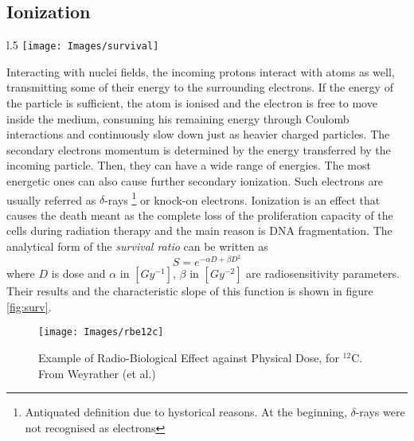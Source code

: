 \documentclass[12pt, a4paper, twoside]{book}
\begin{document}
\subsection{Ionization}
\begin{wrapfigure}{l}{.5\textwidth}
\vspace{-6mm}
\centering
{\texttt{[image: Images/survival]}}
\caption{CHO cells Survival ratio realted with dose, for $X$-rays and $^{12}$C ions. From Weyrather (et al.) \cite{weyr:rbe}}
\label{fig:surv}
\end{wrapfigure}
Interacting with nuclei fields, the incoming protons interact with atoms as well, transmitting some of their energy to the surrounding electrons.
If the energy of the particle is sufficient, the atom is ionised and the electron is free to move inside the medium, consuming his remaining energy through Coulomb interactions and continuously slow down just as heavier charged particles. The secondary electrons momentum is determined by the energy transferred by the incoming particle. Then, they can have a wide range of energies. The most energetic ones can also cause further secondary ionization. 
Such electrons are usually referred as $\delta$-rays \footnote{Antiquated definition due to hystorical reasons. At the beginning, $\delta$-rays were not recognised as electrons} or knock-on electrons.
Ionization is an effect that causes the death meant as the complete loss of the proliferation capacity of the cells during radiation therapy and the main reason is DNA fragmentation. The analytical form of the \emph{survival ratio} can be written as
\[
S = e^{-\alpha D + \beta D^2}
\]
where $D$ is dose and $\alpha$ in $[Gy^{-1}]$, $\beta$ in $[Gy^{-2}]$ are radiosensitivity parameters.
Their results and the characteristic slope of this function is shown in figure \ref{fig:surv}.
\begin{figure}[!t]
\texttt{[image: Images/rbe12c]}
\caption{Example of Radio-Biological Effect against Physical Dose, for $^{12}$C. From Weyrather (et al.) \cite{weyr:rbe}}
\label{fig:rbe12c}
\end{figure}
\end{document}
